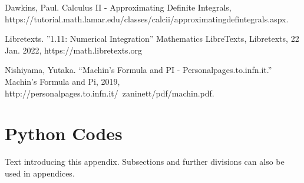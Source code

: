 \documentclass[11pt]{article}
\begin{document}
\begin{thebibliography}{100}
Dawkins, Paul. Calculus II - Approximating Definite Integrals, https://tutorial.math.lamar.edu/classes/calcii/approximatingdefintegrals.aspx. 

Libretexts. ''1.11: Numerical Integration'' Mathematics LibreTexts, Libretexts, 22 Jan. 2022, https://math.libretexts.org

Nishiyama, Yutaka. “Machin’s Formula and PI - Personalpages.to.infn.it.” Machin's Formula and Pi, 2019, http://personalpages.to.infn.it/~zaninett/pdf/machin.pdf. 
%
%

\end{thebibliography}



\newpage
\appendix 
\setcounter{section}{0}           
\section{Python Codes}\label{S:A}
%
Text introducing this appendix. Subsections and further divisions can also be used in appendices. 
\end{document}
